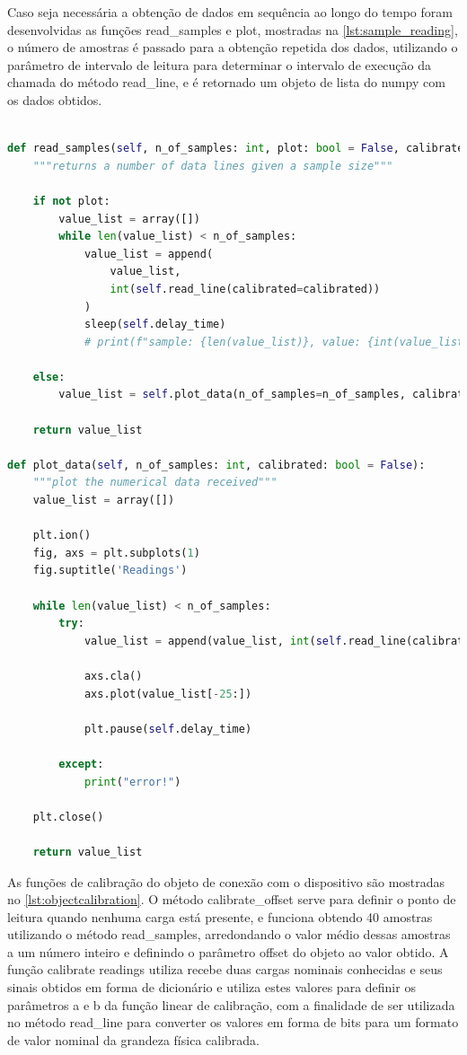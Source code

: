 Caso seja necessária a obtenção de dados em sequência ao longo do tempo foram desenvolvidas as funções read\_samples e plot, mostradas na \autoref{lst:sample_reading},
o número de amostras é passado para a obtenção repetida dos dados, utilizando o parâmetro de intervalo de leitura para determinar o intervalo de execução da chamada do
método read\_line, e é retornado um objeto de lista do numpy com os dados obtidos.

\begin{lstlisting}[language=Python,label={lst:sample_reading},caption={[Network Device calibrate offset]{Métodos para executar experimentos do objeto NetworkDevice}}]

def read_samples(self, n_of_samples: int, plot: bool = False, calibrated: bool = False):
	"""returns a number of data lines given a sample size"""

	if not plot:
		value_list = array([])
		while len(value_list) < n_of_samples:
			value_list = append(
				value_list,
				int(self.read_line(calibrated=calibrated))
			)
			sleep(self.delay_time)
			# print(f"sample: {len(value_list)}, value: {int(value_list[-1])}")

	else:
		value_list = self.plot_data(n_of_samples=n_of_samples, calibrated=calibrated)

	return value_list

def plot_data(self, n_of_samples: int, calibrated: bool = False):
	"""plot the numerical data received"""
	value_list = array([])

	plt.ion()
	fig, axs = plt.subplots(1)
	fig.suptitle('Readings')

	while len(value_list) < n_of_samples:
		try:
			value_list = append(value_list, int(self.read_line(calibrated=calibrated)))

			axs.cla()
			axs.plot(value_list[-25:])

			plt.pause(self.delay_time)

		except:
			print("error!")

	plt.close()

	return value_list

\end{lstlisting}

As funções de calibração do objeto de conexão com o dispositivo são mostradas no \autoref{lst:objectcalibration}. O método calibrate\_offset serve para definir o ponto de leitura quando
nenhuma carga está presente, e funciona obtendo 40 amostras utilizando o método read\_samples, arredondando o valor médio dessas amostras a um número inteiro e definindo o parâmetro
offset do objeto ao valor obtido. A função calibrate readings utiliza recebe duas cargas nominais conhecidas e seus sinais obtidos em forma de dicionário e utiliza estes valores para
definir os parâmetros a e b da função linear de calibração, com a finalidade de ser utilizada no método read\_line para converter os valores em forma de bits para um formato de valor
nominal da grandeza física calibrada.

